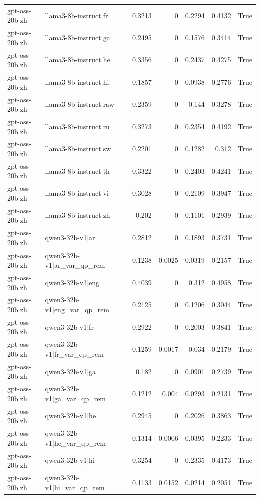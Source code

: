 \begin{table}
\begin{tabular}{l l r r r r l}
gpt-oss-20b|zh & llama3-8b-instruct|fr & 0.3213 & 0 & 0.2294 & 0.4132 & True \\
gpt-oss-20b|zh & llama3-8b-instruct|ga & 0.2495 & 0 & 0.1576 & 0.3414 & True \\
gpt-oss-20b|zh & llama3-8b-instruct|he & 0.3356 & 0 & 0.2437 & 0.4275 & True \\
gpt-oss-20b|zh & llama3-8b-instruct|hi & 0.1857 & 0 & 0.0938 & 0.2776 & True \\
gpt-oss-20b|zh & llama3-8b-instruct|raw & 0.2359 & 0 & 0.144 & 0.3278 & True \\
gpt-oss-20b|zh & llama3-8b-instruct|ru & 0.3273 & 0 & 0.2354 & 0.4192 & True \\
gpt-oss-20b|zh & llama3-8b-instruct|sw & 0.2201 & 0 & 0.1282 & 0.312 & True \\
gpt-oss-20b|zh & llama3-8b-instruct|th & 0.3322 & 0 & 0.2403 & 0.4241 & True \\
gpt-oss-20b|zh & llama3-8b-instruct|vi & 0.3028 & 0 & 0.2109 & 0.3947 & True \\
gpt-oss-20b|zh & llama3-8b-instruct|zh & 0.202 & 0 & 0.1101 & 0.2939 & True \\
gpt-oss-20b|zh & qwen3-32b-v1|ar & 0.2812 & 0 & 0.1893 & 0.3731 & True \\
gpt-oss-20b|zh & qwen3-32b-v1|ar_var_qp_rem & 0.1238 & 0.0025 & 0.0319 & 0.2157 & True \\
gpt-oss-20b|zh & qwen3-32b-v1|eng & 0.4039 & 0 & 0.312 & 0.4958 & True \\
gpt-oss-20b|zh & qwen3-32b-v1|eng_var_qp_rem & 0.2125 & 0 & 0.1206 & 0.3044 & True \\
gpt-oss-20b|zh & qwen3-32b-v1|fr & 0.2922 & 0 & 0.2003 & 0.3841 & True \\
gpt-oss-20b|zh & qwen3-32b-v1|fr_var_qp_rem & 0.1259 & 0.0017 & 0.034 & 0.2179 & True \\
gpt-oss-20b|zh & qwen3-32b-v1|ga & 0.182 & 0 & 0.0901 & 0.2739 & True \\
gpt-oss-20b|zh & qwen3-32b-v1|ga_var_qp_rem & 0.1212 & 0.004 & 0.0293 & 0.2131 & True \\
gpt-oss-20b|zh & qwen3-32b-v1|he & 0.2945 & 0 & 0.2026 & 0.3863 & True \\
gpt-oss-20b|zh & qwen3-32b-v1|he_var_qp_rem & 0.1314 & 0.0006 & 0.0395 & 0.2233 & True \\
gpt-oss-20b|zh & qwen3-32b-v1|hi & 0.3254 & 0 & 0.2335 & 0.4173 & True \\
gpt-oss-20b|zh & qwen3-32b-v1|hi_var_qp_rem & 0.1133 & 0.0152 & 0.0214 & 0.2051 & True \\

\end{tabular}
\end{table}

